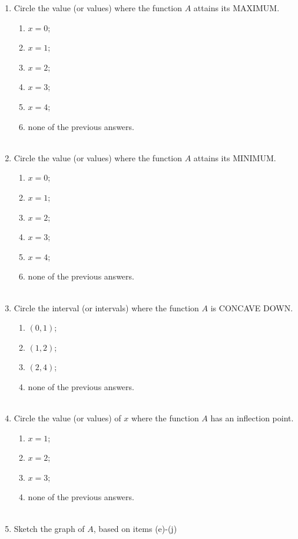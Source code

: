 \documentclass{ximera}
\begin{document}
\begin{problem}
\begin{enumerate}
    \item
      Circle the value (or values) where the function $A$ attains its MAXIMUM.
      \begin{enumerate}
        \item $x = 0$;
        \item $x = 1$;
        \item $x = 2$;
        \item $x = 3$;
        \item $x = 4$;
        \item none of the previous answers.\\ \\
      \end{enumerate}
      
    \item
      Circle the value  (or values) where the function $A$ attains its MINIMUM.
      \begin{enumerate}
        \item $x = 0$;
        \item $x = 1$;
        \item $x = 2$;
        \item $x = 3$;
        \item $x = 4$;
        \item none of the previous answers.\\ \\
      \end{enumerate}
      
    \item
      Circle the interval (or intervals) where the function $A$ is CONCAVE DOWN.
      \begin{enumerate}
        \item $(0, 1)$;
        \item $(1, 2)$;
        \item $(2, 4)$;
        \item none of the previous answers.\\ \\
      \end{enumerate}
      
\item
      Circle the value (or values) of $x$ where the function $A$ has an inflection point.
      \begin{enumerate}
        \item $x = 1$;
        \item $x = 2$;
        \item $x = 3$;
        \item none of the previous answers.\\ \\
      \end{enumerate}
      
\item Sketch the graph of $A$, based on items (e)-(j)

  \end{enumerate}
\end{problem}
\end{document}
